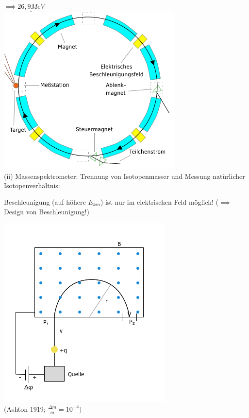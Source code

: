   $\implies \underline{26,9MeV}$\\
  
  \includegraphics[width=0.7\linewidth]{skizzen/16/16_1B04}\\
  
  (ii) Massenspektrometer: Trennung von Isotopenmasser und Messung natürlicher Isotopenverhältnis:
  
  Beschleunigung (auf höhere $ E_{kin} $) ist nur im elektrischen Feld möglich! ($\implies$ Design von Beschleunigung!)
  
  \includegraphics[width=0.7\linewidth]{skizzen/16/16_1B05}\\
  
  (Ashton 1919; $\frac{\Delta m}{m}=10^{-4})$\\
  
